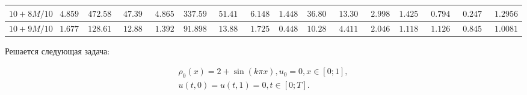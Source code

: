 \begin{landscape}
\begin{tabular}{|c|c|c|c|c|c|c|c|c|c|c|c|c|c|c|c}
$10 + 8M/10$ & $4.8590$                                                        & $472.5872$                                                      & $47.3930$                                                         & $4.8659$                                                           & $337.5925$                                                            & $51.4150$                                                       & $6.1487$                                                          & $1.4483$                                                           & $36.8062$                                                             & $13.3006$                                                       & $2.9984$                                                          & $1.4253$                                                        & $0.79462$                                                          & $0.24765$                                                           & \multicolumn{1}{c|}{$1.29567$}                                                              \\ \hline
$10 + 9M/10$ & $1.6771$                                                        & $128.6127$                                                      & $12.8898$                                                         & $1.3923$                                                           & $91.8983$                                                             & $13.8856$                                                       & $1.7250$                                                          & $0.4481$                                                           & $10.2870$                                                             & $4.4118$                                                        & $2.0468$                                                          & $1.11841$                                                        & $1.1269$                                                          & $0.84543$                                                           & $1.00813$                                                                                   \\ \hline 
\end{tabular}
\end{landscape}

Решается следующая задача:

\begin{equation} \label{p2_2}
    \begin{array}{l}
        \rho_0(x) = 2 + \sin(k\pi x), u_0 = 0, x \in [0;1],\\
        u(t,0) = u(t, 1) = 0, t \in [0; T].
    \end{array}
\end{equation}

